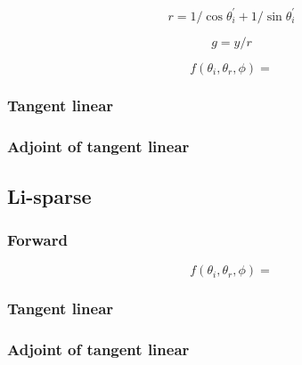 \begin{equation}
r = 1 / \cos\theta^{\prime}_{i} + 1 / \sin\theta^{\prime}_{i}
\label{eq:brdf_kernels-li_common-forward-r}
\end{equation}

\begin{equation}
g = y / r
\label{eq:brdf_kernels-li_common-forward-g}
\end{equation}

\begin{equation}
f(\theta_{i}, \theta_{r}, \phi) =
\label{eq:brdf_kernels-li_common-forward-f}
\end{equation}


\subsubsection{Tangent linear}
\label{sec:brdf_kernels-li_common-tangent_linear}


\subsubsection{Adjoint of tangent linear}
\label{sec:brdf_kernels-li_common-adjoint_of_tangent_linear}


%
\subsection{Li-sparse}
\label{sec:brdf_kernels-li_sparse}

\subsubsection{Forward}
\label{sec:brdf_kernels-li_sparse-forward}

\begin{equation}
f(\theta_{i}, \theta_{r}, \phi) =
\label{eq:brdf_kernels-li_sparse-forward-f}
\end{equation}


\subsubsection{Tangent linear}
\label{sec:brdf_kernels-li_sparse-tangent_linear}


\subsubsection{Adjoint of tangent linear}
\label{sec:brdf_kernels-li_sparse-adjoint_of_tangent_linear}


